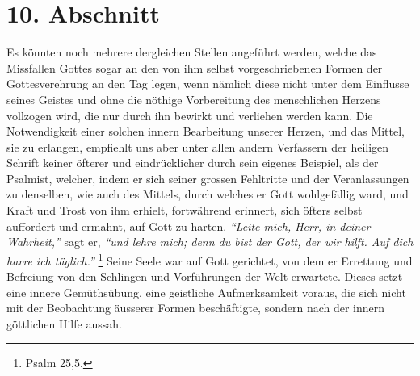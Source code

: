\section{10. Abschnitt} \label{kap6_ab10}
Es könnten noch mehrere dergleichen Stellen
angeführt werden, welche das
Missfallen Gottes sogar an den von ihm selbst vorgeschriebenen Formen der
Gottesverehrung an den Tag legen, wenn nämlich diese nicht
unter dem Einflusse seines Geistes und ohne die nöthige Vorbereitung des
menschlichen Herzens vollzogen wird, die nur durch ihn bewirkt und verliehen
werden kann. Die Notwendigkeit einer solchen innern Bearbeitung unserer Herzen,
und das Mittel, sie zu erlangen, empfiehlt
uns aber unter allen andern Verfassern der heiligen Schrift keiner öfterer und
eindrücklicher durch sein eigenes Beispiel, als der
Psalmist, welcher, indem
er sich seiner grossen Fehltritte und der Veranlassungen zu denselben, wie auch
des Mittels, durch welches er Gott wohlgefällig ward, und Kraft und Trost von
ihm erhielt, fortwährend erinnert, sich öfters selbst auffordert und ermahnt,
auf Gott zu harten.
\textit{"`Leite mich, Herr, in deiner Wahrheit,"'}  sagt er,
\textit{"`und lehre mich; denn du bist der Gott, der wir hilft. Auf dich harre
ich
täglich."'}
\footnote{Psalm 25,5.}
Seine Seele war auf Gott gerichtet, von dem er
Errettung und Befreiung von den Schlingen und Vorführungen der Welt erwartete.
Dieses setzt eine innere Gemüthsübung, eine geistliche Aufmerksamkeit voraus,
die sich nicht mit der Beobachtung äusserer Formen beschäftigte, sondern nach
der innern göttlichen Hilfe aussah.

\medskip

